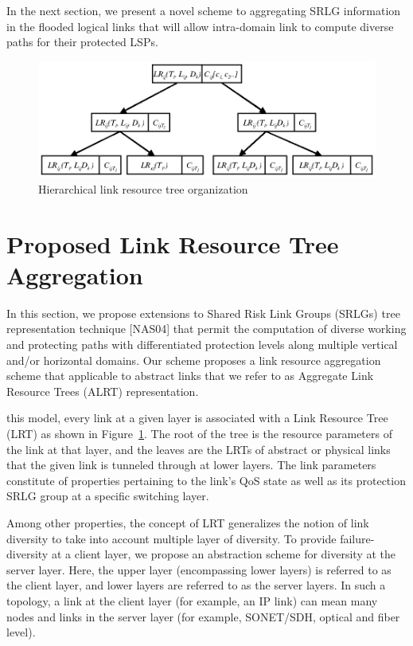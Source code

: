 In the next section, we present a novel scheme to aggregating SRLG information in the flooded logical links that will allow intra-domain link to compute diverse paths for their protected LSPs. 

\begin{figure}[t]
\centering
\includegraphics{Figures/LRT.eps}
\caption{Hierarchical link resource tree organization}
\label{fig:LRT}
\end{figure}

\section{Proposed Link Resource Tree Aggregation}
In this section, we propose extensions to Shared Risk Link Groups (SRLGs) tree representation technique [NAS04] that permit the computation of diverse working and protecting paths with differentiated protection levels along multiple vertical and/or horizontal domains. Our scheme proposes a link resource aggregation scheme that applicable to abstract links that we refer to as Aggregate Link Resource Trees (ALRT) representation.

 this model, every link at a given layer is associated with a Link Resource Tree (\gls{LRT}) as shown in Figure~\ref{fig:LRT}. The root of the tree is the resource parameters of the link at that layer, and the leaves are the LRTs of abstract or physical links that the given link is tunneled through at lower layers. The link parameters constitute of properties pertaining to the link's QoS state as well as its protection \gls{SRLG} group at a specific switching layer.

Among other properties, the concept of \gls{LRT} generalizes the notion of link diversity to take into account multiple layer of diversity. To provide failure-diversity at a client layer, we propose an abstraction scheme for diversity at the server layer. Here, the upper layer (encompassing lower layers) is referred to as the client layer, and lower layers are referred to as the server layers. In such a topology, a link at the client layer (for example, an IP link) can mean many nodes and links in the server layer (for example, SONET/SDH, optical and fiber level).

